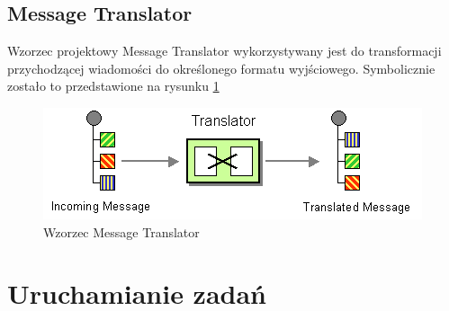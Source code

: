 \subsection{Message Translator}
Wzorzec projektowy Message Translator wykorzystywany jest do transformacji przychodzącej wiadomości do określonego formatu wyjściowego.
Symbolicznie zostało to przedstawione na rysunku \ref{fig:messageTranslator}

\begin{figure}[!h]
 \centering
 \includegraphics{eip/MessageTranslator}
 \caption{Wzorzec Message Translator}
 \label{fig:messageTranslator}
\end{figure}

\section{Uruchamianie zadań}
